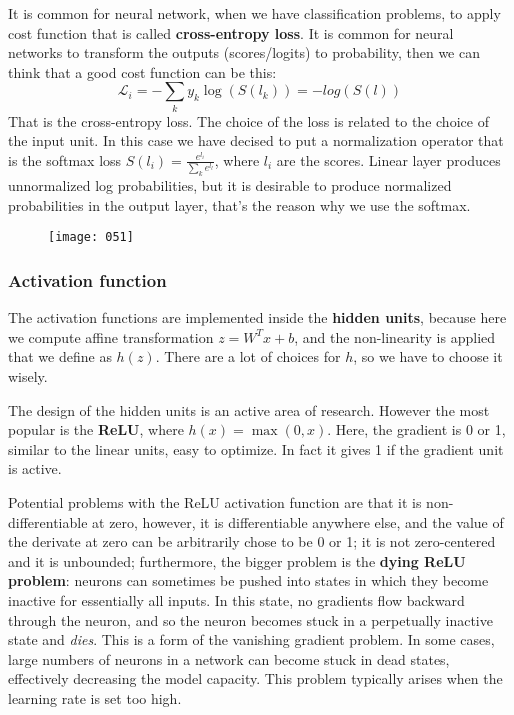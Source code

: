 It is common for neural network, when we have classification problems, to apply cost function that is called \textbf{cross-entropy loss}. It is common for neural networks to transform the outputs (scores/logits) to probability, then we can think that a good cost function can be this:
\begin{equation}
    \mathcal{L}_i = - \sum_k y_k \log(S(l_k)) = -log(S(l))
\end{equation}
That is the cross-entropy loss. The choice of the loss is related to the choice of the input unit. In this case we have decised to put a normalization operator that is the softmax loss \(S(l_i) = \frac {e^{l_i}} {\sum_k e^{l_l}}\), where \(l_i\) are the scores. Linear layer produces unnormalized log probabilities, but it is desirable to produce normalized probabilities in the output layer, that's the reason why we use the softmax.
\begin{figure}[h!]
    \centering
    \texttt{[image: 051]}
    \caption{}
\end{figure}

\subsubsection{Activation function}
The activation functions are implemented inside the \textbf{hidden units}, because here we compute affine transformation \(z = W^Tx + b\), and the non-linearity is applied that we define as \(h(z)\). There are a lot of choices for \(h\), so we have to choose it wisely.

The design of the hidden units is an active area of research. However the most popular is the \textbf{ReLU}, where \(h(x) = \max(0,x)\). Here, the gradient is 0 or 1, similar to the linear units, easy to optimize. In fact it gives 1 if the gradient unit is active.

Potential problems with the ReLU activation function are that it is non-differentiable at zero, however, it is differentiable anywhere else, and the value of the derivate at zero can be arbitrarily chose to be 0 or 1; it is not zero-centered and it is unbounded; furthermore, the bigger problem is the \textbf{dying ReLU problem}: neurons can sometimes be pushed into states in which they become inactive for essentially all inputs. In this state, no gradients flow backward through the neuron, and so the neuron becomes stuck in a perpetually inactive state and \emph{dies}. This is a form of the vanishing gradient problem. In some cases, large numbers of neurons in a network can become stuck in dead states, effectively decreasing the model capacity. This problem typically arises when the learning rate is set too high. 

